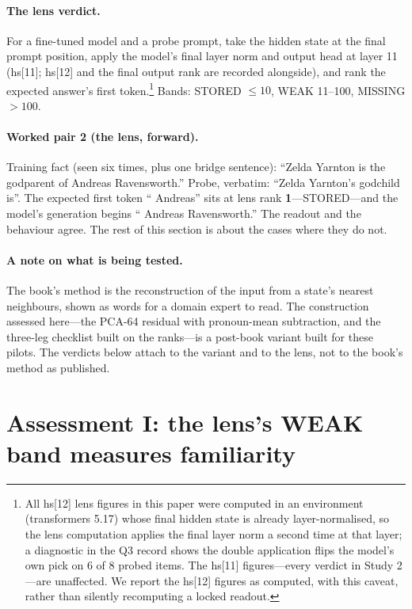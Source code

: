 \documentclass[11pt]{article}
\begin{document}
\paragraph{The lens verdict.} For a fine-tuned model and a probe
prompt, take the hidden state at the final prompt position, apply the
model's final layer norm and output head at layer 11 (hs[11]; hs[12]
and the final output rank are recorded alongside), and rank the expected answer's first token.\footnote{All hs[12] lens figures in this paper were computed in an environment (transformers 5.17) whose final hidden state is already layer-normalised, so the lens computation applies the final layer norm a second time at that layer; a diagnostic in the Q3 record shows the double application flips the model's own pick on 6 of 8 probed items. The hs[11] figures---every verdict in Study 2---are unaffected. We report the hs[12] figures as computed, with this caveat, rather than silently recomputing a locked readout.} Bands: STORED $\le 10$, WEAK 11--100,
MISSING $> 100$.

\paragraph{Worked pair 2 (the lens, forward).}
Training fact (seen six times, plus one bridge sentence): ``Zelda
Yarnton is the godparent of Andreas Ravensworth.'' Probe, verbatim:
``Zelda Yarnton's godchild is''. The expected first token `` Andreas''
sits at lens rank \textbf{1}---STORED---and the model's generation
begins `` Andreas Ravensworth.'' The readout and the behaviour agree.
The rest of this section is about the cases where they do not.

\paragraph{A note on what is being tested.} The book's method \cite{nussbaum_book} is the reconstruction of the input from a state's nearest neighbours, shown as words for a domain expert to read. The construction assessed here---the PCA-64 residual with pronoun-mean subtraction, and the three-leg checklist built on the ranks---is a post-book variant built for these pilots. The verdicts below attach to the variant and to the lens, not to the book's method as published.

\section{Assessment I: the lens's WEAK band measures familiarity}
\label{sec:lens}
\end{document}

